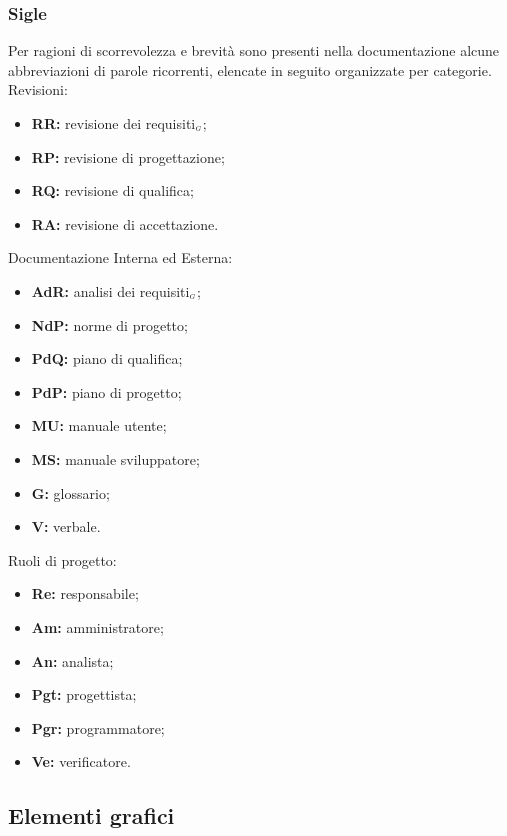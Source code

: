 \subsubsection{Sigle}\label{ProcessiDiSupportoDocumentazioneNormeTipograficheSigle}
Per ragioni di scorrevolezza e brevità sono presenti nella documentazione alcune abbreviazioni di parole ricorrenti, elencate in seguito organizzate per categorie.\\
Revisioni:
\begin{itemize}
  \item \textbf{RR:} revisione dei requisiti$_{\scaleto{G}{3pt}}$;
	\item \textbf{RP:} revisione di progettazione;
 	\item \textbf{RQ:} revisione di qualifica;
	\item \textbf{RA:} revisione di accettazione.
\end{itemize}
Documentazione Interna ed Esterna:
\begin{itemize}
  \item \textbf{AdR:} analisi dei requisiti$_{\scaleto{G}{3pt}}$;
	\item \textbf{NdP:} norme di progetto;
	\item \textbf{PdQ:} piano di qualifica;
	\item \textbf{PdP:} piano di progetto;
	\item \textbf{MU:} manuale utente;
	\item \textbf{MS:} manuale sviluppatore;
	\item \textbf{G:} glossario;
	\item \textbf{V:} verbale.
\end{itemize}
Ruoli di progetto:
\begin{itemize}
  \item \textbf{Re:} responsabile;
	\item \textbf{Am:} amministratore;
	\item \textbf{An:} analista;
	\item \textbf{Pgt:} progettista;
	\item \textbf{Pgr:} programmatore;
	\item \textbf{Ve:} verificatore.
\end{itemize}
\subsection{Elementi grafici}\label{ProcessiDiSupportoDocumentazioneElementiGrafici}
